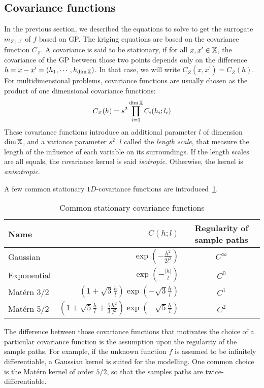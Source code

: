 \documentclass[../../Main_ManuscritThese.tex]{subfiles}
\begin{document}
\subsection{Covariance functions}
\label{sec:cov_fun}
In the previous section, we described the equations to solve to get the surrogate $m_{Z\mid \mathcal{X}}$ of $f$ based on GP.
The kriging equations are based on the covariance function $C_Z$.
A covariance is said to be stationary, if for all $x, x^{\prime} \in \mathbb{X}$, the covariance of the GP between those two points depends only on the  difference $h = x-x^{\prime}=(h_1,\cdots, h_{\dim\mathbb{X}})$. In that case, we will write $C_Z(x, x^{\prime}) = C_Z(h)$.
For multidimensional problems, covariance functions are usually chosen as the product of one dimensional covariance functions:
\begin{equation}
  C_Z(h) = s^2\prod_{i=1}^{\dim \mathbb{X}} C_i(h_i;l_i)
\end{equation}
These covariance functions introduce an additional parameter $l$ of dimension $\dim \mathbb{X}$, and a variance parameter $s^2$.
$l$ called the \emph{length scale}, that measure the length of the influence of each variable on its surroundings. If the length scales are all equals, the covariance kernel is said \emph{isotropic}. Otherwise, the kernel is \emph{anisotropic}.

A few common stationary $1D$-covariance functions are introduced~\cref{tab:common_cov_fc}.

  \begin{table}[ht]
    \centering
    \begin{tabular}{lrc}
      \toprule
      Name & $C(h;l)$ & Regularity of sample paths\\ \midrule
      Gaussian & $\exp\left(- \frac{h^2}{2 l^2}\right)$ & $C^{\infty}$\\
      Exponential &$\exp\left(- \frac{\lvert h \rvert}{l}\right)$ & $C^0$  \\
      Matérn 3/2 & $\left(1 + \sqrt{3}\frac{h}{l}\right)\exp\left(-\sqrt{3}\frac{h}{l}\right)$ & $C^1$\\
      Matérn 5/2 & $\left(1+ \sqrt{5}\frac{h}{l} + \frac{5}{3}\frac{h^2}{l^2}\right) \exp\left(-\sqrt{5}\frac{h}{l}\right)$ & $C^2$\\ \bottomrule
    \end{tabular}
    \caption{\label{tab:common_cov_fc} Common stationary covariance functions}
  \end{table}

  The difference between those covariance functions that motivates the choice of a particular covariance function is the assumption upon the regularity of the sample paths. For example, if the unknown function $f$ is assumed to be infinitely differentiable, a Gaussian kernel is suited for the modelling. One common choice is the Matérn kernel of order $5/2$, so that the samples paths are twice-differentiable.
\end{document}
